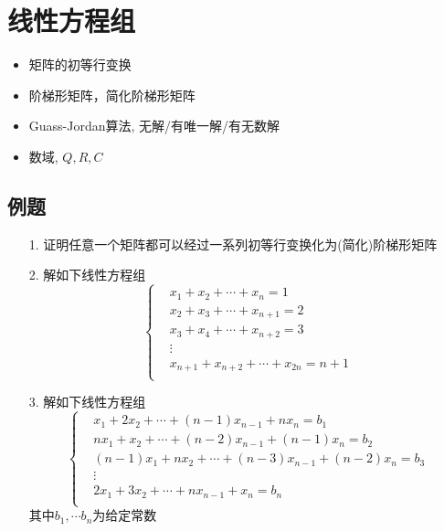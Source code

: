 \section{线性方程组}
\begin{itemize}
    \item 矩阵的初等行变换
    \item 阶梯形矩阵，简化阶梯形矩阵
    \item Guass-Jordan算法, 无解/有唯一解/有无数解
    \item 数域, $Q,R,C$
\end{itemize}

\subsection*{例题}
\begin{itemize}
    \item[1.] 证明任意一个矩阵都可以经过一系列初等行变换化为(简化)阶梯形矩阵
    \vspace{2.5cm}

    \item[2.] 解如下线性方程组
    \begin{equation}
    \nonumber
        \left\{
        \begin{aligned}
            &x_1 + x_2 + \cdots + x_n = 1\\
            &x_2 + x_3 + \cdots + x_{n+1} = 2\\
            &x_3 + x_4 + \cdots + x_{n+2} = 3\\
            &\vdots\\
            &x_{n+1}+x_{n+2}+ \cdots + x_{2n} = n+1\\
        \end{aligned}
        \right.
    \end{equation} 
    \vspace{2.5cm}

    \item[3.] 解如下线性方程组
    \begin{equation}
    \nonumber
        \left\{
        \begin{aligned}
            &x_1 +2x_2 +\cdots +(n-1)x_{n-1} +nx_{n} =b_1\\
            &nx_1 +x_2 +\cdots +(n-2)x_{n-1} +(n-1)x_{n} =b_2\\
            &(n-1)x_1 +nx_2 +\cdots +(n-3)x_{n-1} +(n-2)x_{n} =b_3\\
            &\vdots\\
            &2x_1 +3x_2 +\cdots +nx_{n-1} +x_{n} =b_n\\
        \end{aligned}
        \right.
    \end{equation} 
    其中$b_1,\cdots b_n$为给定常数
    \vspace{2.5cm}
\end{itemize}

